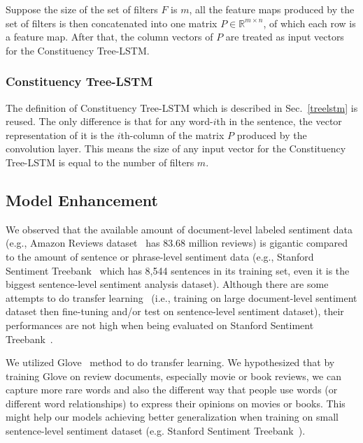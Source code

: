 Suppose the size of the set of filters \(F\) is \(m\), all the feature maps produced by the set of filters is then concatenated into one matrix \(P \in \mathbb{R}^{m \times n}\), of which each row is a feature map.
After that, the column vectors of \(P\) are treated as input vectors for the Constituency Tree-LSTM.
\subsubsection{Constituency Tree-LSTM}
The definition of Constituency Tree-LSTM which is described in Sec.~\ref{treelstm} is reused.
The only difference is that for any word-\(i\)th in the sentence, the vector representation of it is the \(i\)th-column of the matrix \(P\) produced by the convolution layer.
This means the size of any input vector for the Constituency Tree-LSTM is equal to the number of filters \(m\).
\subsection{Model Enhancement}
We observed that the available amount of document-level labeled sentiment data (e.g., Amazon Reviews dataset~\cite{amazon-reviews} has 83.68 million reviews) is gigantic compared to the amount of sentence or phrase-level sentiment data (e.g., Stanford Sentiment Treebank~\cite{socher2013recursive} which has 8,544 sentences in its training set, even it is the biggest sentence-level sentiment analysis dataset).
Although there are some attempts to do transfer learning~\cite{group-instance, re-embedding} (i.e., training on large document-level sentiment dataset then fine-tuning and/or test on sentence-level sentiment dataset), their performances are not high when being evaluated on Stanford Sentiment Treebank~\cite{group-instance}.

We utilized Glove~\cite{glove} method to do transfer learning.
We hypothesized that by training Glove on review documents, especially movie or book reviews, we can capture more rare words and also the different way that people use words (or different word relationships) to express their opinions on movies or books.
This might help our models achieving better generalization when training on small sentence-level sentiment dataset (e.g. Stanford Sentiment Treebank~\cite{socher2013recursive}).
